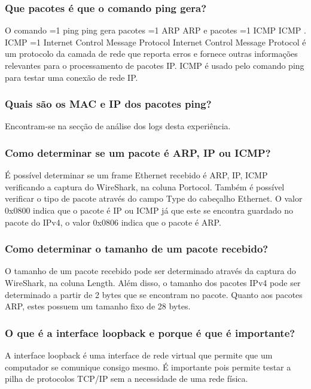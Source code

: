 \documentclass[11pt,a4paper,twocolumn]{article}
\newcommand{\hl}[2][1]{%
  \ifnum#1=1\relax
    \textcolor{text-hl1}{#2}%
  \else
    \textcolor{text-hl2}{#2}%
  \fi
}
\begin{document}
\subsubsection{Que pacotes é que o comando ping gera?}

O comando \hl{ping} gera pacotes \hl{ARP} e pacotes \hl{ICMP}. ICMP \hl{Internet Control Message Protocol} é um protocolo da camada de rede que reporta erros e fornece outras informações relevantes para o processamento de pacotes IP. ICMP é usado pelo comando ping para testar uma conexão de rede IP.

\subsubsection{Quais são os MAC e IP dos pacotes ping?}

Encontram-se na secção de análise dos logs desta experiência. 

\subsubsection{Como determinar se um pacote é ARP, IP ou ICMP?}

É possível determinar se um frame Ethernet recebido é ARP, IP, ICMP verificando a captura do WireShark, na coluna Portocol. Também é possível verificar o tipo de pacote através do campo Type do cabeçalho Ethernet. O valor 0x0800 indica que o pacote é IP ou ICMP já que este se encontra guardado no pacote do IPv4, o valor 0x0806 indica que o pacote é ARP.

\subsubsection{Como determinar o tamanho de um pacote recebido?}

O tamanho de um pacote recebido pode ser determinado através da captura do WireShark, na coluna Length. Além disso, o tamanho dos pacotes IPv4 pode ser determinado a partir de 2 bytes que se encontram no pacote.
Quanto aos pacotes ARP, estes possuem um tamanho fixo de 28 bytes.

\subsubsection{O que é a interface loopback e porque é que é importante?}

A interface loopback é uma interface de rede virtual que permite que um computador se comunique consigo mesmo. É importante pois permite testar a pilha de protocolos TCP/IP sem a necessidade de uma rede física.
\end{document}
